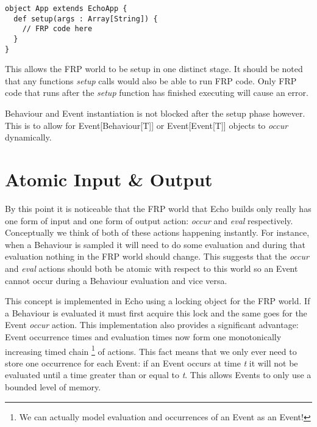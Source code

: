 \begin{verbatim}
object App extends EchoApp {
  def setup(args : Array[String]) {
    // FRP code here
  }
}
\end{verbatim}
  
    This allows the FRP world to be setup in one distinct stage. It should be noted that
    any functions \emph{setup} calls would also be able to run FRP code. Only FRP code that runs
    after the \emph{setup} function has finished executing will cause an error.
    
    Behaviour and Event instantiation is not blocked after the setup phase however. This is
    to allow for Event[Behaviour[T]] or Event[Event[T]] objects to \emph{occur}
    dynamically.
    
  \section{Atomic Input \& Output}

     By this point it is noticeable that the FRP world that Echo builds only really has one form of input and one
     form of output action: \emph{occur} and \emph{eval} respectively. Conceptually we think of both of these
     actions happening instantly. For instance, when a Behaviour is sampled it will need to do some evaluation
     and during that evaluation nothing in the FRP world should change. This suggests that the \emph{occur}
     and \emph{eval} actions should both be atomic with respect to this world so an Event cannot occur during
     a Behaviour evaluation and vice versa. 

     This concept is implemented in Echo using a locking object for the FRP world. If a Behaviour is evaluated it
     must first acquire this lock and the same goes for the Event \emph{occur} action. This implementation
     also provides a significant advantage: Event occurrence times and evaluation times now form one
     monotonically increasing timed chain \footnote{We can actually model evaluation and occurrences of an Event as an 
     Event!} of actions. This fact means that we only ever need to store one occurrence for each Event: if an Event occurs
     at time \emph{t} it will not be evaluated until a time greater than or equal to \emph{t}. This allows
     Events to only use a bounded level of memory. 

